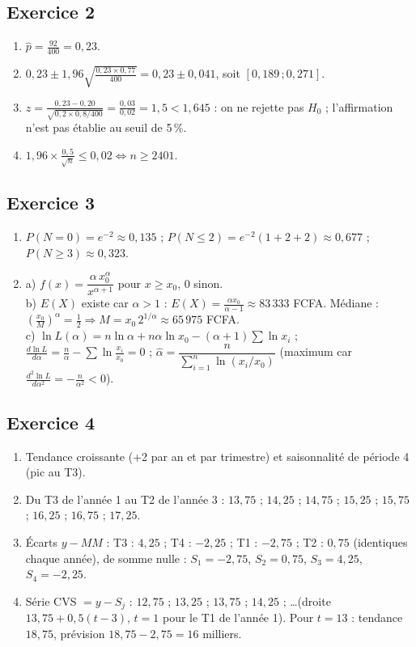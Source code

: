 \documentclass[11pt,a4paper]{article}
\begin{document}
\subsection*{Exercice 2}
\begin{enumerate}
  \item $\hat{p} = \frac{92}{400} = 0{,}23$.
  \item $0{,}23 \pm 1{,}96\sqrt{\frac{0{,}23\times0{,}77}{400}} = 0{,}23 \pm 0{,}041$, soit $[0{,}189\,;0{,}271]$.
  \item $z = \frac{0{,}23 - 0{,}20}{\sqrt{0{,}2\times0{,}8/400}} = \frac{0{,}03}{0{,}02} = 1{,}5 < 1{,}645$ :
  on ne rejette pas $H_0$ ; l'affirmation n'est pas établie au seuil de 5\,\%.
  \item $1{,}96\times\frac{0{,}5}{\sqrt n} \leqslant 0{,}02 \iff n \geqslant 2401$.
\end{enumerate}

\subsection*{Exercice 3}
\begin{enumerate}
  \item $P(N=0) = e^{-2} \approx 0{,}135$ ; $P(N\leqslant2) = e^{-2}(1 + 2 + 2) \approx 0{,}677$ ; $P(N\geqslant3) \approx 0{,}323$.
  \item a) $f(x) = \dfrac{\alpha\,x_0^{\alpha}}{x^{\alpha+1}}$ pour $x \geqslant x_0$, $0$ sinon.\\
  b) $E(X)$ existe car $\alpha > 1$ : $E(X) = \frac{\alpha x_0}{\alpha - 1} \approx 83\,333$ FCFA.
  Médiane : $\left(\frac{x_0}{M}\right)^{\alpha} = \frac12 \Rightarrow M = x_0\,2^{1/\alpha} \approx 65\,975$ FCFA.\\
  c) $\ln L(\alpha) = n\ln\alpha + n\alpha\ln x_0 - (\alpha+1)\sum\ln x_i$ ;
  $\frac{d\ln L}{d\alpha} = \frac n\alpha - \sum\ln\frac{x_i}{x_0} = 0$ ;
  $\hat\alpha = \dfrac{n}{\sum_{i=1}^n \ln(x_i/x_0)}$ (maximum car $\frac{d^2\ln L}{d\alpha^2} = -\frac{n}{\alpha^2} < 0$).
\end{enumerate}

\subsection*{Exercice 4}
\begin{enumerate}
  \item Tendance croissante (+2 par an et par trimestre) et saisonnalité de période 4 (pic au T3).
  \item Du T3 de l'année 1 au T2 de l'année 3 :
  $13{,}75$ ; $14{,}25$ ; $14{,}75$ ; $15{,}25$ ; $15{,}75$ ; $16{,}25$ ; $16{,}75$ ; $17{,}25$.
  \item Écarts $y - MM$ : T3 : $4{,}25$ ; T4 : $-2{,}25$ ; T1 : $-2{,}75$ ; T2 : $0{,}75$ (identiques chaque année),
  de somme nulle : $S_1 = -2{,}75$, $S_2 = 0{,}75$, $S_3 = 4{,}25$, $S_4 = -2{,}25$.
  \item Série CVS $= y - S_j$ : $12{,}75$ ; $13{,}25$ ; $13{,}75$ ; $14{,}25$ ; \dots (droite $13{,}75 + 0{,}5(t-3)$, $t=1$ pour le T1 de l'année 1).
  Pour $t = 13$ : tendance $18{,}75$, prévision $18{,}75 - 2{,}75 = 16$ milliers.
\end{enumerate}
\end{document}
